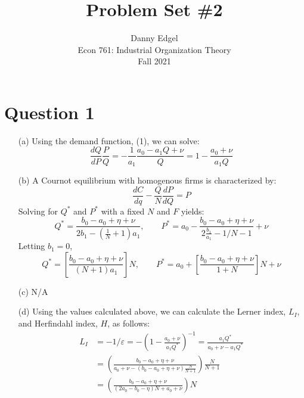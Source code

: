 \documentclass{article}
\begin{document}
\title{	Problem Set \#2 }
\author{ 	Danny Edgel 					        	      \\ 
			Econ 761: Industrial Organization Theory	\\
			Fall 2021						                      \\
		}
\maketitle\thispagestyle{empty}



\section*{Question 1}
\begin{itemize}
    \item[(a)] Using the demand function, (1), we can solve: \[
    \frac{dQ}{dP}\frac{P}{Q} = -\frac{1}{a_1}\frac{a_0 - a_1Q + \nu}{Q} = 1 - \frac{a_0 + \nu}{a_1Q}
    \] 
    \item[(b)] A Cournot equilibrium with homogenous firms is characterized by:\[
      \frac{dC}{dq} - \frac{Q}{N}\frac{dP}{dQ} = P
    \]
    Solving for $Q^*$ and $P^*$ with a fixed $N$ and $F$ yields:\[
      Q^* = \frac{b_0-a_0 + \eta+\nu}{2b_1-\left(\frac{1}{N}+1\right)a_1},\quad\quad 
      P^* = a_0 - \frac{b_0 - a_0 + \eta + \nu}{2\frac{b_1}{a_1} - 1/N - 1} + \nu
    \]
    Letting $b_1=0$,\[
      Q^* = \left[\frac{b_0-a_0 + \eta+\nu}{(N+1)a_1}\right]N,\quad\quad 
      P^* = a_0 + \left[\frac{b_0 - a_0 + \eta + \nu}{1+N}\right]N + \nu
    \]
    \item[(c)] N/A %
    \item[(d)] Using the values calculated above, we can calculate the Lerner index, $L_I$, and Herfindahl index, $H$, as follows: \begin{align*}
      L_I &=  -1/\varepsilon = -\left(1 - \frac{a_0 + \nu}{a_1Q^*}\right)^{-1} = \frac{a_1Q^*}{a_0 + \nu - a_1Q^*} \\ &= \left(\frac{b_0-a_0 + \eta+\nu}{a_0 + \nu -(b_0-a_0 + \eta+\nu)\frac{N}{N+1}}\right)\frac{N}{N+1} \\ &= \left(\frac{b_0-a_0 + \eta+\nu}{(2a_0 - b_0 - \eta)N + a_0 + \nu}\right)N \\

\end{align*}
\end{itemize}
\end{document}
